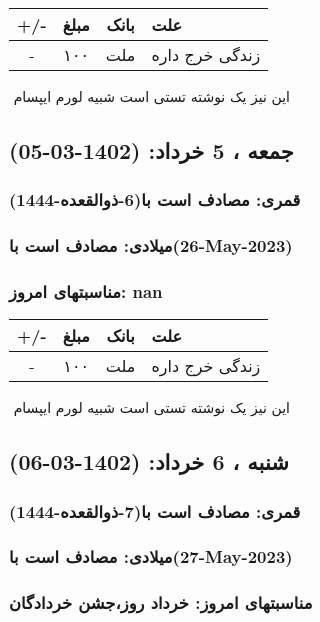 \documentclass{article}
\newcommand{\rnote}[1]{\marginpar{\textcolor{color}{\StrSubstitute{\##1}{ }{\_}}}}
\newcommand{\myRow}[4]{
    #1 & #2 & #3 & #4 \\ \hline
}
\begin{document}
\begin{tabular}{ | c | c | c | p{5cm} |}
    \hline
    \myRow{ +/- }{مبلغ}{بانک}{علت}
    \myRow{-}{۱۰۰}{ملت}{زندگی خرج داره}
\end{tabular}
\newline
\newline

‌
\rnote{تست}
این نیز یک نوشته تستی است شبیه لورم ایپسام




\newpage
{}
\textcolor{color}{
\section{ جمعه ، 5 خرداد: (1402-03-05) }
\subsubsection*{قمری: مصادف است با(6-ذوالقعده-1444)} 
\subsubsection*{میلادی: مصادف است با(26-May-2023)}
\subsubsection*{مناسبتهای امروز: nan}
}


\begin{tabular}{ | c | c | c | p{5cm} |}
    \hline
    \myRow{ +/- }{مبلغ}{بانک}{علت}
    \myRow{-}{۱۰۰}{ملت}{زندگی خرج داره}
\end{tabular}
\newline
\newline

‌
\rnote{تست}
این نیز یک نوشته تستی است شبیه لورم ایپسام




\newpage
{}
\textcolor{color}{
\section{ شنبه ، 6 خرداد: (1402-03-06) }
\subsubsection*{قمری: مصادف است با(7-ذوالقعده-1444)} 
\subsubsection*{میلادی: مصادف است با(27-May-2023)}
\subsubsection*{مناسبتهای امروز: خرداد روز،جشن خردادگان}
}
\end{document}
